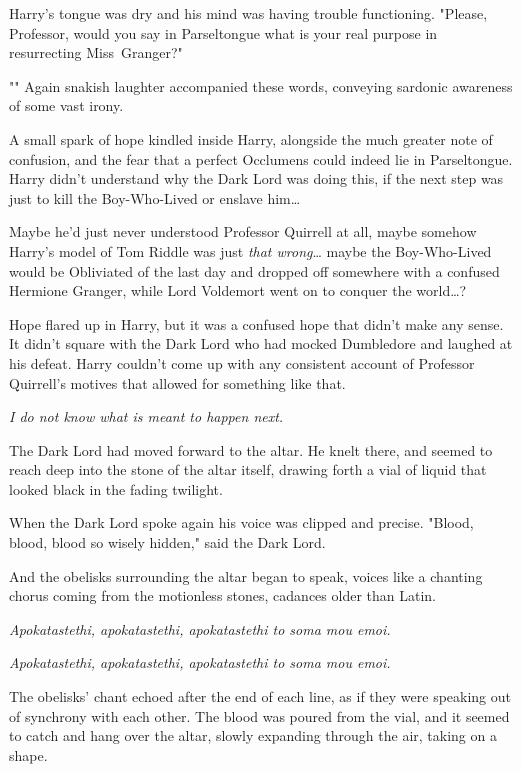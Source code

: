Harry's tongue was dry and his mind was having trouble functioning. "Please,
Professor, would you say in Parseltongue what is your real purpose in
resurrecting Miss~Granger?"

"" Again snakish laughter
accompanied these words, conveying sardonic awareness of some vast irony.

A small spark of hope kindled inside Harry, alongside the much greater note of
confusion, and the fear that a perfect Occlumens could indeed lie in
Parseltongue. Harry didn't understand why the Dark Lord was doing this, if the
next step was just to kill the Boy-Who-Lived or enslave him{\ldots}

Maybe he'd just never understood Professor Quirrell at all, maybe somehow
Harry's model of Tom Riddle was just \emph{that wrong}{\ldots} maybe the
Boy-Who-Lived would be Obliviated of the last day and dropped off somewhere
with a confused Hermione Granger, while Lord Voldemort went on to conquer the
world{\ldots}?

Hope flared up in Harry, but it was a confused hope that didn't make any sense.
It didn't square with the Dark Lord who had mocked Dumbledore and laughed at
his defeat. Harry couldn't come up with any consistent account of Professor
Quirrell's motives that allowed for something like that.

\emph{I do not know what is meant to happen next.}

The Dark Lord had moved forward to the altar. He knelt there, and seemed to
reach deep into the stone of the altar itself, drawing forth a vial of liquid
that looked black in the fading twilight.

When the Dark Lord spoke again his voice was clipped and precise. "Blood,
blood, blood so wisely hidden," said the Dark Lord.

And the obelisks surrounding the altar began to speak, voices like a chanting
chorus coming from the motionless stones, cadances older than Latin.

\emph{Apokatastethi, apokatastethi, apokatastethi to soma mou emoi.}

\emph{Apokatastethi, apokatastethi, apokatastethi to soma mou emoi.}

The obelisks' chant echoed after the end of each line, as if they were speaking
out of synchrony with each other. The blood was poured from the vial, and it
seemed to catch and hang over the altar, slowly expanding through the air,
taking on a shape.

